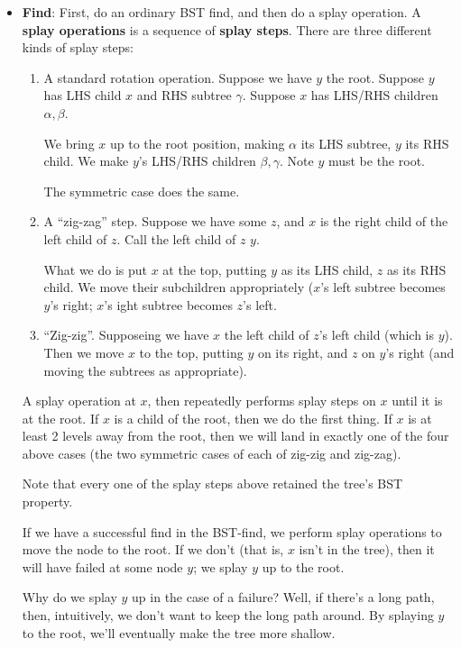 \documentclass{article}
\begin{document}
\begin{itemize}
	\item
	\textbf{Find}:
	First, do an ordinary BST find, and then do a splay operation.
	A \textbf{splay operations} is a sequence of \textbf{splay steps}.
	There are three different kinds of splay steps:
	\begin{enumerate}
		\item
			A standard rotation operation. Suppose we have $y$ the root.
			Suppose $y$ has LHS child $x$ and RHS subtree $\gamma$.
			Suppose $x$ has LHS/RHS children $\alpha, \beta$.
			
			We bring $x$ up to the root position, making $\alpha$ its LHS
			subtree, $y$ its RHS child.
			We make $y$'s LHS/RHS children $\beta,\gamma$.
			Note $y$ must be the root.
			
			The symmetric case does the same.

		\item
			A ``zig-zag'' step.
			Suppose we have some $z$, and $x$ is the right child of the
			left child of $z$. Call the left child of $z$ $y$.
			
			What we do is put $x$ at the top, putting $y$ as its LHS
			child, $z$ as its RHS child.
			We move their subchildren appropriately ($x$'s left subtree
			becomes $y$'s right; $x$'s ight subtree becomes $z$'s left.
		\item
			``Zig-zig''.
			Supposeing we have $x$ the left child of $z$'s left child (which
			is $y$).
			Then we move $x$ to the top, putting $y$ on its right, and $z$
			on $y$'s right (and moving the subtrees as appropriate).
	\end{enumerate}
	A splay operation at $x$, then repeatedly performs splay steps on $x$
	until it is at the root.
	If $x$ is a child of the root, then we do the first thing.
	If $x$ is at least 2 levels away from the root, then we will land in
	exactly one of the four above cases (the two symmetric cases of each of
	zig-zig and zig-zag).
	
	Note that every one of the splay steps above retained the tree's BST 
	property.
	
	If we have a successful find in the BST-find, we perform splay operations
	to move the node to the root.
	If we don't (that is, $x$ isn't in the tree), then it will have failed
	at some node $y$; we splay $y$ up to the root.
	
	Why do we splay $y$ up in the case of a failure? Well, if there's a long
	path, then, intuitively, we don't want to keep the long path around.
	By splaying $y$ to the root, we'll eventually make the tree more shallow.
	

\end{itemize}
\end{document}
